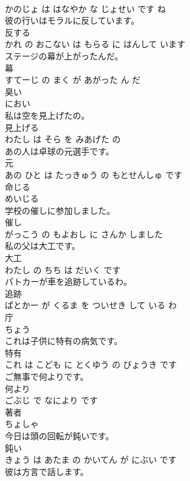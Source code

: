 \documentclass[8pt]{extreport}
\begin{document}
\begin{CJK}{UTF8}{min}
\\	かのじょ は はなやか な じょせい です ね			
\\	彼の行いはモラルに反しています。	
\\	反する 
\\	かれ の おこない は もらる に はんして います			
\\	ステージの幕が上がったんだ。	
\\	幕 
\\	すてーじ の まく が あがった ん だ			
\\	臭い	
\\	におい		
\\	私は空を見上げたの。	
\\	見上げる 
\\	わたし は そら を みあげた の			
\\	あの人は卓球の元選手です。	
\\	元 
\\	あの ひと は たっきゅう の もとせんしゅ です			
\\	命じる	
\\	めいじる		
\\	学校の催しに参加しました。	
\\	催し 
\\	がっこう の もよおし に さんか しました			
\\	私の父は大工です。	
\\	大工 
\\	わたし の ちち は だいく です			
\\	パトカーが車を追跡しているわ。	
\\	追跡 
\\	ぱとかー が くるま を ついせき して いる わ			
\\	庁	
\\	ちょう		
\\	これは子供に特有の病気です。	
\\	特有 
\\	これ は こども に とくゆう の びょうき です			
\\	ご無事で何よりです。	
\\	何より 
\\	ごぶじ で なにより です			
\\	著者	
\\	ちょしゃ		
\\	今日は頭の回転が鈍いです。	
\\	鈍い 
\\	きょう は あたま の かいてん が にぶい です			
\\	彼は方言で話します。	

\end{CJK}
\end{document}
